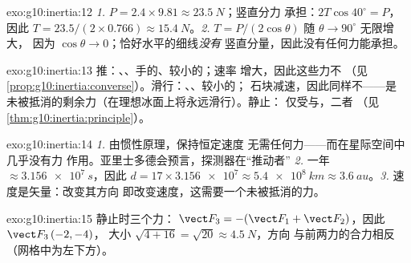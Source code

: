 \begin{solution}{exo:g10:inertia:12}
\emph{1.} $P = 2.4 \times 9.81 \approx \qty{23.5}{N}$；竖直分力
承担：$2T\cos 40^\circ = P$，因此
$T = 23.5/(2 \times 0.766) \approx \qty{15.4}{N}$。\emph{2.}
$T = P/(2\cos\theta)$ 随 $\theta \to 90^\circ$ 无限增大，
因为 $\cos\theta \to 0$；恰好水平的细线\emph{没有}
竖直分量，因此没有任何力能承担。
\end{solution}

\begin{solution}{exo:g10:inertia:13}
推：、、手的、较小的；速率
增大，因此这些力不
（见\cref{prop:g10:inertia:converse}）。滑行：、、较小的；
石块减速，因此同样不——是
未被抵消的剩余力（在理想冰面上将永远滑行）。静止：
仅受与，二者
（见\cref{thm:g10:inertia:principle}）。
\end{solution}

\begin{solution}{exo:g10:inertia:14}
\emph{1.} 由惯性原理，保持恒定速度
无需任何力——而在星际空间中几乎没有力
作用。亚里士多德会预言，探测器在“推动者”
\emph{2.} 一年 $\approx \qty{3.156e7}{s}$，因此
$d = 17 \times \num{3.156e7} \approx \qty{5.4e8}{km} \approx
\qty{3.6}{au}$。\emph{3.} 速度是矢量：改变其方向
即改变速度，这需要一个未被抵消的力。
\end{solution}

\begin{solution}{exo:g10:inertia:15}
静止时三个力：
$\vect F_3 = -(\vect F_1 + \vect F_2)$，因此 $\vect F_3\,(-2, -4)$，
大小 $\sqrt{4 + 16} = \sqrt{20} \approx \qty{4.5}{N}$，方向
与前两力的合力相反（网格中为左下方）。
\end{solution}

